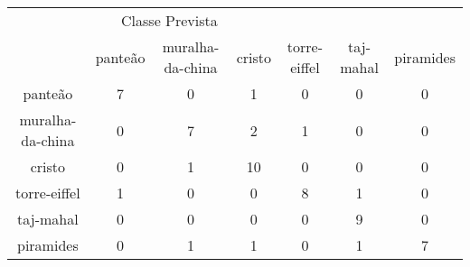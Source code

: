 \begin{tabular}{|c|c|c|c|c|c|c|}
\hline
\multicolumn{5}{|c|}{Classe Prevista}\\
 & panteão & muralha-da-china & cristo & torre-eiffel & taj-mahal & piramides\\
panteão & 7 & 0 & 1 & 0 & 0 & 0\\
muralha-da-china & 0 & 7 & 2 & 1 & 0 & 0\\
cristo & 0 & 1 & 10 & 0 & 0 & 0\\
torre-eiffel & 1 & 0 & 0 & 8 & 1 & 0\\
taj-mahal & 0 & 0 & 0 & 0 & 9 & 0\\
piramides & 0 & 1 & 1 & 0 & 1 & 7\\
\end{tabular}
